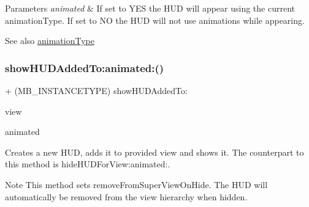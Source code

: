 \begin{DoxyParams}{Parameters}
{\em animated} & If set to Y\+ES the H\+UD will appear using the current animation\+Type. If set to NO the H\+UD will not use animations while appearing.\\
\hline
\end{DoxyParams}
\begin{DoxySeeAlso}{See also}
\mbox{\hyperlink{interface_m_b_progress_h_u_d_a71d04bb9e2839df9377ad10d03b2e468}{animation\+Type}} 
\end{DoxySeeAlso}
\mbox{\label{interface_m_b_progress_h_u_d_a2a981df80fbbb85db0d6c660d5882292}} 
\subsubsection{\texorpdfstring{show\+H\+U\+D\+Added\+To\+:animated\+:()}{showHUDAddedTo:animated:()}\hspace{0.1cm}{\footnotesize\ttfamily [1/3]}}
{\footnotesize\ttfamily + (M\+B\+\_\+\+I\+N\+S\+T\+A\+N\+C\+E\+T\+Y\+PE) show\+H\+U\+D\+Added\+To\+: \begin{DoxyParamCaption}\item[{(U\+I\+View $\ast$)}]{view }\item[{animated:(B\+O\+OL)}]{animated }\end{DoxyParamCaption}}

Creates a new H\+UD, adds it to provided view and shows it. The counterpart to this method is hide\+H\+U\+D\+For\+View\+:animated\+:.

\begin{DoxyNote}{Note}
This method sets {\ttfamily remove\+From\+Super\+View\+On\+Hide}. The H\+UD will automatically be removed from the view hierarchy when hidden.
\end{DoxyNote}

